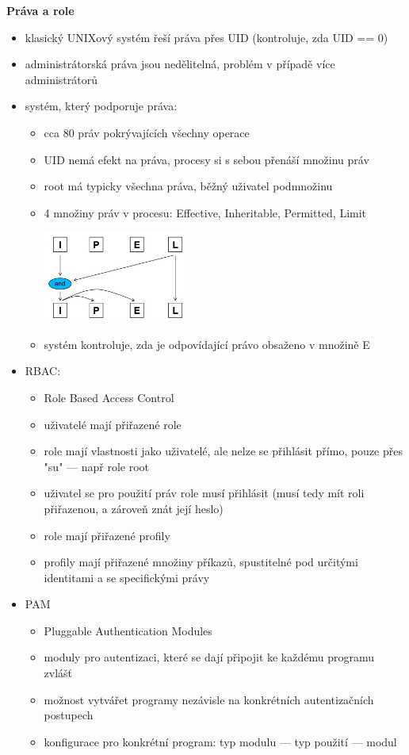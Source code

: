 \textbf{Práva a role}
\begin{itemize}
	\item klasický UNIXový systém řeší práva přes UID (kontroluje, zda UID == 0)
	\item administrátorská práva jsou nedělitelná, problém v případě více administrátorů
	\item systém, který podporuje práva:
	\begin{itemize}
		\item cca 80 práv pokrývajících všechny operace
		\item UID nemá efekt na práva, procesy si s sebou přenáší množinu práv
		\item root má typicky všechna práva, běžný uživatel podmnožinu
		\item 4 množiny práv v procesu: Effective, Inheritable, Permitted, Limit
		
		\includegraphics[width=0.4\textwidth]{img/OB-1_0.jpg}
		
		\item systém kontroluje, zda je odpovídající právo obsaženo v množině E
	\end{itemize}
	\item RBAC:
	\begin{itemize}
		\item Role Based Access Control
		\item uživatelé mají přiřazené role
		\item role mají vlastnosti jako uživatelé, ale nelze se přihlásit přímo, pouze přes "su" --- např role root
		\item uživatel se pro použití práv role musí přihlásit (musí tedy mít roli přiřazenou, a zároveň znát její heslo)
		\item role mají přiřazené profily
		\item profily mají přiřazené množiny příkazů, spustitelné pod určitými identitami a se specifickými právy
	\end{itemize}
	\item PAM
	\begin{itemize}
		\item Pluggable Authentication Modules
		\item moduly pro autentizaci, které se dají připojit ke každému programu zvlášť
		\item možnost vytvářet programy nezávisle na konkrétních autentizačních postupech
		\item konfigurace pro konkrétní program: typ modulu --- typ použití --- modul
		

\end{itemize}
\end{itemize}
